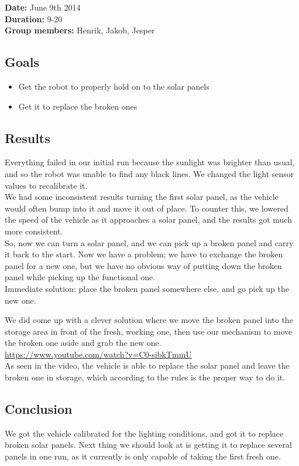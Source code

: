 \textbf{Date:} June 9th 2014\\\textbf{Duration:} 9-20\\\textbf{Group
members:} Henrik, Jakob, Jesper

\subsection{Goals}

\begin{itemize}
\itemsep1pt\parskip0pt
\item
  Get the robot to properly hold on to the solar panels
\item
  Get it to replace the broken ones
\end{itemize}

\subsection{Results}

Everything failed in our initial run because the sunlight was brighter
than usual, and so the robot was unable to find any black lines. We
changed the light sensor values to recalibrate it.\\We had some
inconsistent results turning the first solar panel, as the vehicle would
often bump into it and move it out of place. To counter this, we lowered
the speed of the vehicle as it approaches a solar panel, and the results
got much more consistent.\\So, now we can turn a solar panel, and we can
pick up a broken panel and carry it back to the start. Now we have a
problem; we have to exchange the broken panel for a new one, but we have
no obvious way of putting down the broken panel while picking up the
functional one.\\Immediate solution: place the broken panel somewhere
else, and go pick up the new one.

We did come up with a clever solution where we move the broken panel
into the storage area in front of the fresh, working one, then use our
mechanism to move the broken one aside and grab the new
one.\\\url{https://www.youtube.com/watch?v=C0-sibkTmmU}\\As seen in the
video, the vehicle is able to replace the solar panel and leave the
broken one in storage, which according to the rules is the proper way to
do it.

\subsection{Conclusion}

We got the vehicle calibrated for the lighting conditions, and got it to
replace broken solar panels. Next thing we should look at is getting it
to replace several panels in one run, as it currently is only capable of
taking the first fresh one.
